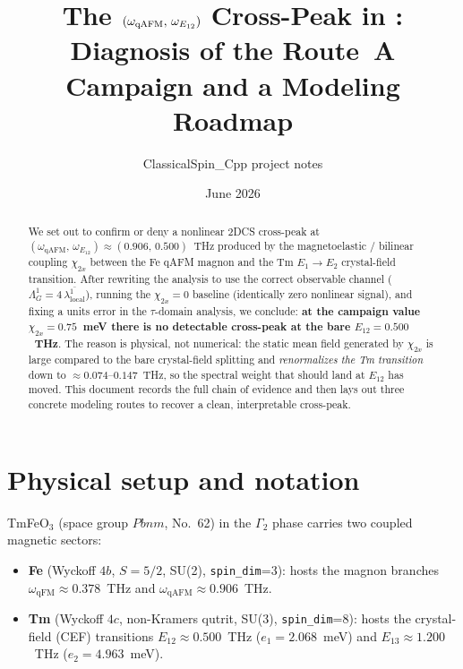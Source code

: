 \documentclass[11pt,a4paper]{article}
\title{\textbf{The $(\omega_{\qAFM},\,\omega_{\EtA})$ Cross-Peak in \FeOs:\\
Diagnosis of the Route~A Campaign and a Modeling Roadmap}}
\author{ClassicalSpin\_Cpp project notes}
\date{June 2026}
\newcommand{\FeOs}{TmFeO$_3$}
\newcommand{\Gtwo}{\Gamma_2}
\newcommand{\qAFM}{\mathrm{qAFM}}
\newcommand{\qFM}{\mathrm{qFM}}
\newcommand{\EtA}{E_{12}}
\newcommand{\EtB}{E_{13}}
\newcommand{\chitwox}{\chi_{2x}}
\newcommand{\crossP}{(\omega_{\qAFM},\,\omega_{\EtA})}
\begin{document}
\maketitle

\begin{abstract}
We set out to confirm or deny a nonlinear 2DCS cross-peak at
$\crossP \approx (0.906,\,0.500)$~THz produced by the magnetoelastic / bilinear
coupling $\chitwox$ between the Fe qAFM magnon and the Tm $E_{1}\!\to\!E_{2}$
crystal-field transition. After rewriting the analysis to use the correct
observable channel ($\Lambda^1_G = 4\,\overline{\lambda^1_{\text{local}}}$), running
the $\chitwox=0$ baseline (identically zero nonlinear signal), and fixing a
units error in the $\tau$-domain analysis, we conclude: \textbf{at the campaign
value $\chitwox = 0.75$~meV there is no detectable cross-peak at the bare
$\EtA=0.500$~THz}. The reason is physical, not numerical: the static
mean field generated by $\chitwox$ is large compared to the bare crystal-field
splitting and \emph{renormalizes the Tm transition} down to
$\approx 0.074$--$0.147$~THz, so the spectral weight that should land at
$\EtA$ has moved. This document records the full chain of evidence and then
lays out three concrete modeling routes to recover a clean, interpretable
cross-peak.
\end{abstract}

\tableofcontents

\section{Physical setup and notation}

\FeOs{} (space group $Pbnm$, No.~62) in the $\Gtwo$ phase carries two coupled
magnetic sectors:
\begin{itemize}[nosep]
  \item \textbf{Fe} (Wyckoff $4b$, $S=5/2$, SU(2), \texttt{spin\_dim}=3): hosts
        the magnon branches $\omega_{\qFM}\approx 0.378$~THz and
        $\omega_{\qAFM}\approx 0.906$~THz.
  \item \textbf{Tm} (Wyckoff $4c$, non-Kramers qutrit, SU(3),
        \texttt{spin\_dim}=8): hosts the crystal-field (CEF) transitions
        $\EtA \approx 0.500$~THz ($e_1=2.068$~meV) and
        $\EtB \approx 1.200$~THz ($e_2=4.963$~meV).
\end{itemize}
\end{document}
